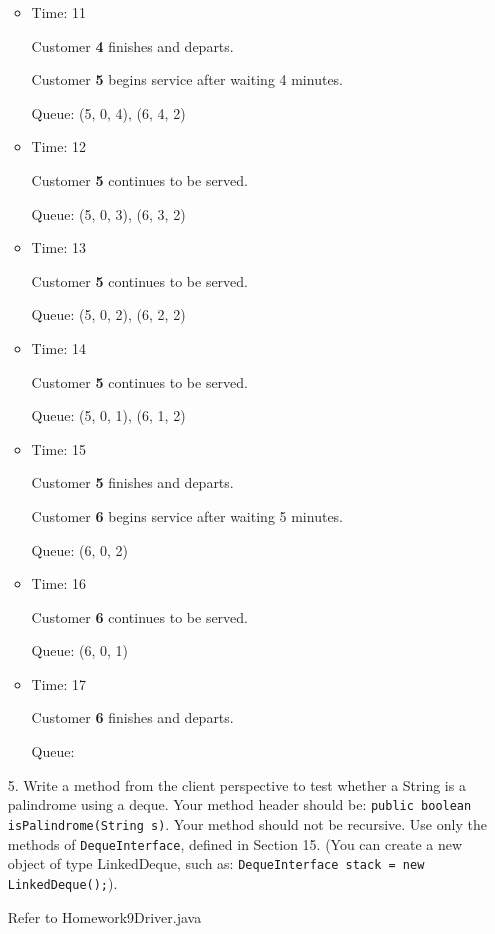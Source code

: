 \documentclass[10pt]{article}
\begin{document}
\begin{enumerate}
\begin{itemize}
				\item Time: 11
					
					Customer \textbf{4} finishes and departs.
					
					Customer \textbf{5} begins service after waiting 4 minutes.
					
					Queue: (5, 0, 4), (6, 4, 2)
				
				\item Time: 12
					
					Customer \textbf{5} continues to be served.
					
					Queue: (5, 0, 3), (6, 3, 2)
				
				\item Time: 13
					
					Customer \textbf{5} continues to be served.
					
					Queue: (5, 0, 2), (6, 2, 2)
				
				\item Time: 14
					
					Customer \textbf{5} continues to be served.
					
					Queue: (5, 0, 1), (6, 1, 2)
					
				\item Time: 15
					
					Customer \textbf{5} finishes and departs.
					
					Customer \textbf{6} begins service after waiting 5 minutes.
					
					Queue: (6, 0, 2)
				
				\item Time: 16
					
					Customer \textbf{6} continues to be served.
					
					Queue: (6, 0, 1)
				
				\item Time: 17
					
					Customer \textbf{6} finishes and departs.
					
					Queue:
			\end{itemize}
			\vspace{0.5cm}
		
		\item[5.] Write a method from the client perspective to test whether a String is a palindrome using a deque. Your method header should be: \texttt{public boolean isPalindrome(String s)}. Your method should not be recursive. Use only the methods of \texttt{DequeInterface}, defined in Section 15. (You can create a new object of type LinkedDeque, such as: \texttt{DequeInterface stack = new LinkedDeque();}).
			
			\vspace{0.5cm}
			Refer to Homework9Driver.java
			\vspace{0.5cm}
	\end{enumerate}
\end{document}
